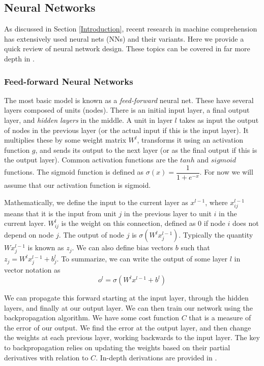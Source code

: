 \documentclass[pageno]{final_paper}
\begin{document}
\subsection{Neural Networks}
\label{Neural Networks}

As discussed in Section \ref{Introduction}, recent research in machine
comprehension has extensively used neural nets (NNs) and their variants. Here we
provide a quick review of neural network design. These topics can be covered in
far more depth in \cite{Bishop1995, Nielsen2015}.

\subsubsection{Feed-forward Neural Networks}
\label{Feed-forward Neural Networks}

The most basic model is known as a \textit{feed-forward} neural net. These have
several layers composed of units (nodes). There is an initial input layer, a
final output layer, and \textit{hidden layers} in the middle. A unit in layer
$l$ takes as input the output of nodes in the previous layer (or the actual
input if this is the input layer). It multiplies these by some weight matrix
$W^l$, transforms it using an activation function $g$, and sends its output to the
next layer (or as the final output if this is the output layer). Common
activation functions are the $tanh$ and $sigmoid$ functions. The sigmoid
function is defined as $\sigma (x) = \dfrac{1}{1+e^{-x}}$. For now we will assume
that our activation function is sigmoid.

Mathematically, we define the input to the current layer as $x^{l-1}$,
where $x^{l-1}_{ij}$ means that it is the input from unit $j$ in the previous
layer to unit $i$ in the current layer. $W^l_{ij}$ is the weight on this
connection, defined as 0 if node $i$ does not depend on node $j$. The output of
node $j$ is $\sigma ( W^l x^{l-1}_j)$. Typically the quantity $Wx^{l-1}_j$ is
known as $z_j$. We can also define bias vectors $b$ such that $z_j =
W^lx^{l-1}_j + b^l_j$. To summarize, we can write the output of some layer $l$
in vector notation as
$$o^l = \sigma(W^lx^{l-1} + b^l)$$

We can propagate this forward starting at the input layer, through the hidden
layers, and finally at our output layer. We can then train our network using the
backpropagation algorithm. We have some cost function $C$ that is a measure of
the error of our output. We find the error at the output layer, and then change
the weights at each previous layer, working backwards to the input layer. The
key to backpropagation relies on updating the weights based on their partial
derivatives with relation to $C$. In-depth derivations are provided in
\cite{Bishop1995, Nielsen2015}.
\end{document}

